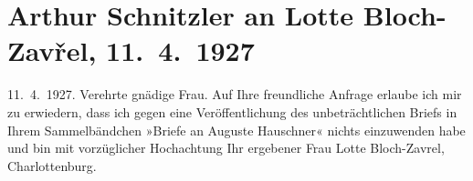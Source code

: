 

         
         \newcommand{\erwaehntePersonen}{Personen: Lotte Bloch-Zavřel}
         \newcommand{\erwaehnteInstitutionen}{}
         \newcommand{\erwaehnteOrte}{Orte: Berlin, Charlottenburg, Wien}
         \newcommand{\erwaehnteWerke}{Werke: Briefe an Auguste Hauschner}
               \section[Arthur Schnitzler an Lotte Bloch-Zavřel, 11. 4. 1927]{ Arthur Schnitzler an Lotte Bloch-Zavřel, 11. 4. 1927}\nopagebreak{}\rehead{ }\begin{ledgroupsized}[t]{13cm}\normalsize\beginnumbering \toendnotes[C]{\smallbreak\pagebreak[2]} 
\pstart
           \raggedleft{}{\pb}11. 4. 1927.\pend
           \pstart{}Verehrte gnädige Frau.\pend\pstart
           Auf Ihre freundliche Anfrage erlaube ich mir zu erwiedern, dass ich gegen eine
               Veröffentlichung des unbeträchtlichen Briefs in Ihrem Sammelbändchen »Briefe an Auguste Hauschner« nichts einzuwenden habe und bin
               mit vorzüglicher Hochachtung\pend
           \pstart Ihr ergebener\pend{}{\bigskip}\pstart
           \noindent{}Frau Lotte Bloch-Zavrel,\pend
           \pstart
           Charlottenburg.\pend
           
         
         \endnumbering{}\end{ledgroupsized}  \newcommand{\dateiname}{L02584}\newcommand{\titel}{Arthur Schnitzler an Lotte Bloch-Zavřel, 11. 4. 1927}\newcommand{\editorInnen}{Martin Anton Müller und Laura Untner}
      